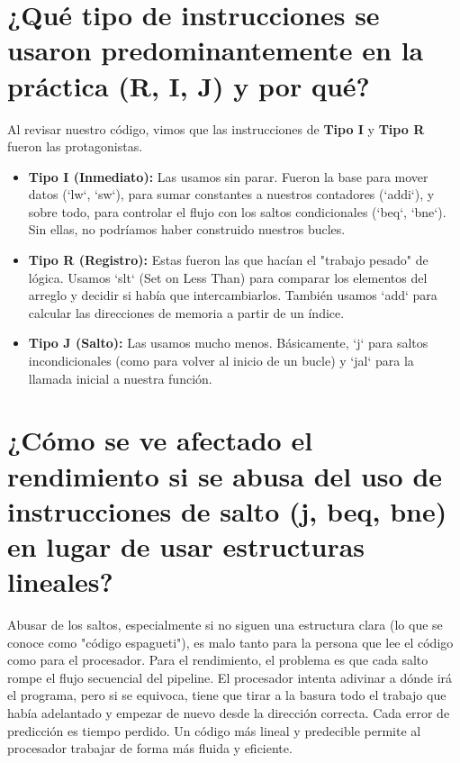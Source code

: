 \documentclass{article}
\begin{document}
\section{¿Qué tipo de instrucciones se usaron predominantemente en la práctica (R, I, J) y por qué?}
\indent\indent Al revisar nuestro código, vimos que las instrucciones de \textbf{Tipo I} y \textbf{Tipo R} fueron las protagonistas.
\begin{itemize}
    \item \textbf{Tipo I (Inmediato):} Las usamos sin parar. Fueron la base para mover datos (`lw`, `sw`), para sumar constantes a nuestros contadores (`addi`), y sobre todo, para controlar el flujo con los saltos condicionales (`beq`, `bne`). Sin ellas, no podríamos haber construido nuestros bucles.
    \item \textbf{Tipo R (Registro):} Estas fueron las que hacían el "trabajo pesado" de lógica. Usamos `slt` (Set on Less Than) para comparar los elementos del arreglo y decidir si había que intercambiarlos. También usamos `add` para calcular las direcciones de memoria a partir de un índice.
    \item \textbf{Tipo J (Salto):} Las usamos mucho menos. Básicamente, `j` para saltos incondicionales (como para volver al inicio de un bucle) y `jal` para la llamada inicial a nuestra función.
\end{itemize}

\section{¿Cómo se ve afectado el rendimiento si se abusa del uso de instrucciones de salto (j, beq, bne) en lugar de usar estructuras lineales?}
\indent\indent Abusar de los saltos, especialmente si no siguen una estructura clara (lo que se conoce como "código espagueti"), es malo tanto para la persona que lee el código como para el procesador. Para el rendimiento, el problema es que cada salto rompe el flujo secuencial del pipeline. El procesador intenta adivinar a dónde irá el programa, pero si se equivoca, tiene que tirar a la basura todo el trabajo que había adelantado y empezar de nuevo desde la dirección correcta. Cada error de predicción es tiempo perdido. Un código más lineal y predecible permite al procesador trabajar de forma más fluida y eficiente.

\newpage
\end{document}
